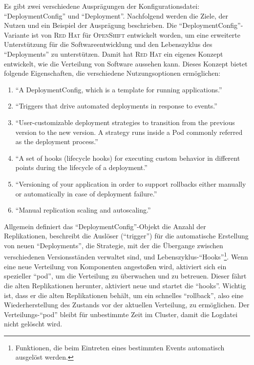 Es gibt zwei verschiedene Ausprägungen der Konfigurationsdatei: \enquote{DeploymentConfig} und \enquote{Deployment}. Nachfolgend werden die Ziele, der Nutzen und ein Beispiel der Ausprägung beschrieben. Die \enquote{DeploymentConfig}-Variante ist von \textsc{Red Hat} für \textsc{OpenShift} entwickelt worden, um eine erweiterte Unterstützung für die Softwareentwicklung und den Lebenszyklus des \enquote{Deployments} zu unterstützen. Damit hat \textsc{Red Hat} ein eigenes Konzept entwickelt, wie die Verteilung von Software aussehen kann. Dieses Konzept bietet folgende Eigenschaften, die verschiedene Nutzungsoptionen ermöglichen:\autocite[vgl.][Application\,$\rightarrow$\,Deployments]{red_hat_inc_okd_2019}
\begin{enumerate}
	\item \enquote{A DeploymentConfig, which is a template for running applications.}
	\item \enquote{Triggers that drive automated deployments in response to events.}
	\item \enquote{User-customizable deployment strategies to transition from the previous version to the new version. A strategy runs inside a Pod commonly referred as the deployment process.}
	\item \enquote{A set of hooks (lifecycle hooks) for executing custom behavior in different points during the lifecycle of a deployment.}
	\item \enquote{Versioning of your application in order to support rollbacks either manually or automatically in case of deployment failure.}
	\item \enquote{Manual replication scaling and autoscaling.} 
\end{enumerate}
Allgemein definiert das \enquote{DeploymentConfig}-Objekt die Anzahl der Replikationen, beschreibt die Auslöser (\enquote{trigger}) für die automatische Erstellung von neuen \enquote{Deployments}, die Strategie, mit der die Übergange zwischen verschiedenen Versionsständen verwaltet sind, und Lebenszyklus-\enquote{Hooks}\footnote{Funktionen, die beim Eintreten eines bestimmten Events automatisch ausgelöst werden.}. Wenn eine neue Verteilung von Komponenten angestoßen wird, aktiviert sich ein spezieller \enquote{pod}, um die Verteilung zu überwachen und zu betreuen. Dieser fährt die alten Replikationen herunter, aktiviert neue und startet die \enquote{hooks}. Wichtig ist, dass er die alten Replikationen behält, um ein schnelles \enquote{rollback}, also eine Wiederherstellung des Zustands vor der aktuellen Verteilung, zu ermöglichen. Der Verteilungs-\enquote{pod} bleibt für unbestimmte Zeit im Cluster, damit die Logdatei nicht gelöscht wird. 

